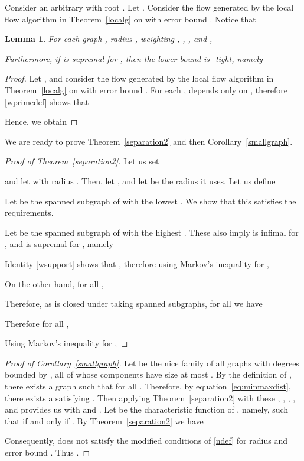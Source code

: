 \documentclass[12pt,a4paper]{article}
\newtheorem{Lemma}[Theorem]{Lemma}
\renewcommand{\:}{\colon}
\begin{document}
Consider an arbitrary  with root . Let . Consider the flow  generated by the local flow algorithm in Theorem~\ref{localg} on  with error bound . 
Notice that


\begin{Lemma} \label{WHG}
For each graph , radius , weighting , , ,  and ,

Furthermore, if  is supremal for , then the lower bound is -tight, namely

\end{Lemma}

\begin{proof}
Let , and consider the flow  generated by the local flow algorithm in Theorem~\ref{localg} on  with error bound . For each ,  depends only on , therefore \eqref{wprimedef} shows that

Hence, we obtain




\end{proof}

We are ready to prove Theorem~\ref{separation2} and then Corollary~\ref{smallgraph}. 

\begin{proof}[Proof of Theorem~\ref{separation2}]
Let us set

and let  with radius . Then, let , and let  be the radius it uses. Let us define

Let  be the spanned subgraph of  with the lowest . We show that this satisfies the requirements.

Let  be the spanned subgraph of  with the highest . These also imply  is infimal for , and  is supremal for , namely






Identity \eqref{wsupport} shows that , therefore using Markov's inequality for ,




On the other hand, for all ,

Therefore, as  is closed under taking spanned subgraphs, for all  we have 


Therefore for all ,

Using Markov's inequality for ,

\end{proof}

\begin{proof}[Proof of Corollary~\ref{smallgraph}]
Let  be the nice family of all graphs with degrees bounded by , all of whose components have size at most . 
By the definition of , there exists a graph  such that  for all . 
Therefore, by equation~\eqref{eq:minmaxdist}, there exists a  satisfying . 
Then applying Theorem~\ref{separation2} with these , , , , and  provides us with  and . 
Let  be the characteristic function of , namely,  such that  if and only if . 
By Theorem~\ref{separation2} we have

 

Consequently,  does not satisfy the modified conditions of \eqref{ndef} for radius  and error bound . 
Thus .
\end{proof}
\end{document}

